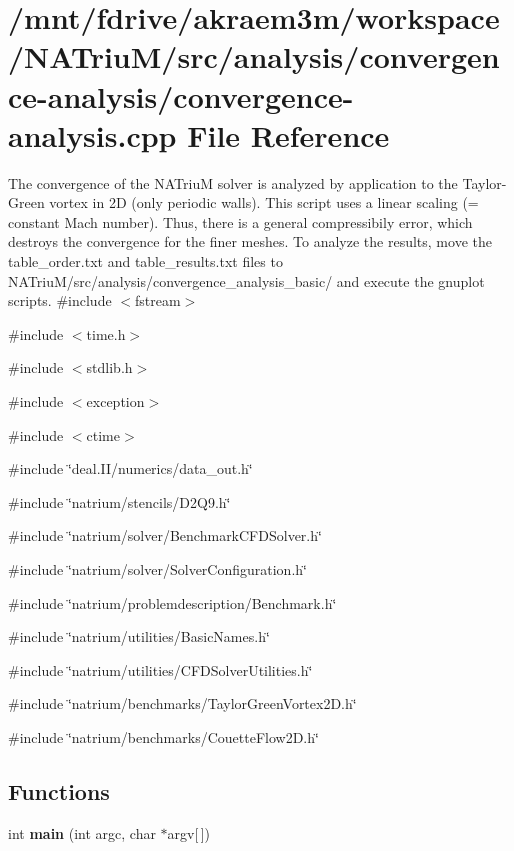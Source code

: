 \hypertarget{convergence-analysis_8cpp}{
\section{/mnt/fdrive/akraem3m/workspace/NATriuM/src/analysis/convergence-\/analysis/convergence-\/analysis.cpp File Reference}
\label{convergence-analysis_8cpp}
}


The convergence of the NATriuM solver is analyzed by application to the Taylor-\/Green vortex in 2D (only periodic walls). This script uses a linear scaling (= constant Mach number). Thus, there is a general compressibily error, which destroys the convergence for the finer meshes. To analyze the results, move the table\_\-order.txt and table\_\-results.txt files to NATriuM/src/analysis/convergence\_\-analysis\_\-basic/ and execute the gnuplot scripts.  
{\ttfamily \#include $<$fstream$>$}\par
{\ttfamily \#include $<$time.h$>$}\par
{\ttfamily \#include $<$stdlib.h$>$}\par
{\ttfamily \#include $<$exception$>$}\par
{\ttfamily \#include $<$ctime$>$}\par
{\ttfamily \#include \char`\"{}deal.II/numerics/data\_\-out.h\char`\"{}}\par
{\ttfamily \#include \char`\"{}natrium/stencils/D2Q9.h\char`\"{}}\par
{\ttfamily \#include \char`\"{}natrium/solver/BenchmarkCFDSolver.h\char`\"{}}\par
{\ttfamily \#include \char`\"{}natrium/solver/SolverConfiguration.h\char`\"{}}\par
{\ttfamily \#include \char`\"{}natrium/problemdescription/Benchmark.h\char`\"{}}\par
{\ttfamily \#include \char`\"{}natrium/utilities/BasicNames.h\char`\"{}}\par
{\ttfamily \#include \char`\"{}natrium/utilities/CFDSolverUtilities.h\char`\"{}}\par
{\ttfamily \#include \char`\"{}natrium/benchmarks/TaylorGreenVortex2D.h\char`\"{}}\par
{\ttfamily \#include \char`\"{}natrium/benchmarks/CouetteFlow2D.h\char`\"{}}\par
\subsection*{Functions}
\begin{DoxyCompactItemize}
\item 
\hypertarget{convergence-analysis_8cpp_a0ddf1224851353fc92bfbff6f499fa97}{
int {\bfseries main} (int argc, char $\ast$argv\mbox{[}$\,$\mbox{]})}
\label{convergence-analysis_8cpp_a0ddf1224851353fc92bfbff6f499fa97}

\end{DoxyCompactItemize}


